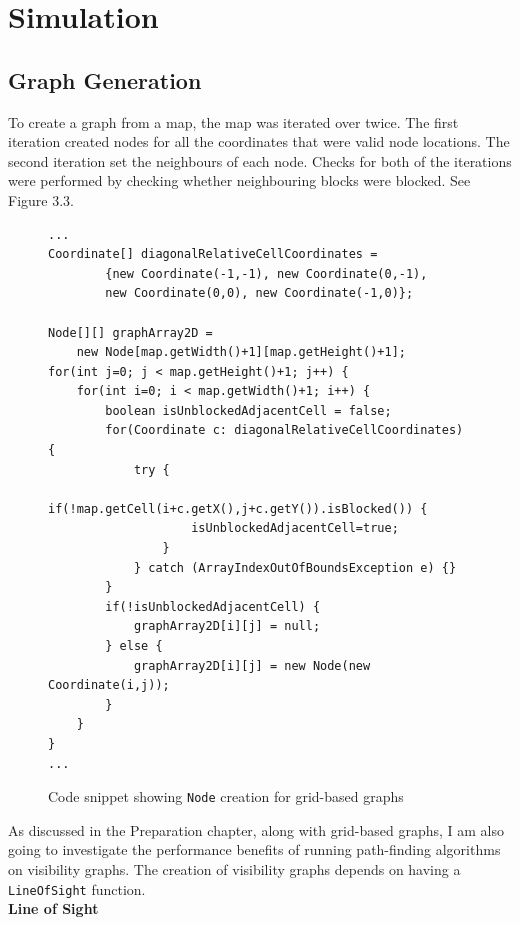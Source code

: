 \documentclass[12pt,notitlepage]{report}
\begin{document}
\newpage
\section{Simulation}

\subsection{Graph Generation}

To create a graph from a map, the map was iterated over twice. The first iteration created nodes for all the coordinates that were valid node locations. The second iteration set the neighbours of each node. Checks for both of the iterations were performed by checking whether neighbouring blocks were blocked. See Figure 3.3.\\

\begin{figure}
\begin{lstlisting}
...
Coordinate[] diagonalRelativeCellCoordinates = 
		{new Coordinate(-1,-1), new Coordinate(0,-1), 
		new Coordinate(0,0), new Coordinate(-1,0)};
		
Node[][] graphArray2D = 
	new Node[map.getWidth()+1][map.getHeight()+1];
for(int j=0; j < map.getHeight()+1; j++) {
	for(int i=0; i < map.getWidth()+1; i++) {
		boolean isUnblockedAdjacentCell = false;
		for(Coordinate c: diagonalRelativeCellCoordinates) {
			try {
				if(!map.getCell(i+c.getX(),j+c.getY()).isBlocked()) {
					isUnblockedAdjacentCell=true;
				}
			} catch (ArrayIndexOutOfBoundsException e) {}
		}
		if(!isUnblockedAdjacentCell) {
			graphArray2D[i][j] = null;
		} else {
			graphArray2D[i][j] = new Node(new Coordinate(i,j));
		}
	}
}
...
\end{lstlisting}
\caption{Code snippet showing {\tt Node} creation for grid-based graphs}
\end{figure}

\noindent
As discussed in the Preparation chapter, along with grid-based graphs, I am also going to investigate the performance benefits of running path-finding algorithms on visibility graphs. The creation of visibility graphs depends on having a {\tt LineOfSight} function.\\

\noindent
{\bf Line of Sight}\\
\end{document}

